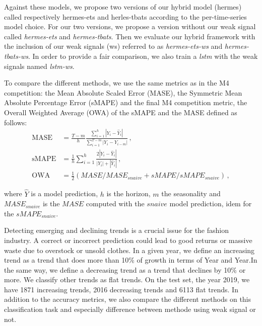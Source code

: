 \documentclass{article} %
\newcommand{\lag}{h}
\begin{document}
Against these models, we propose two versions of our hybrid model (hermes) called respectively hermes-ets and herles-tbats according to the per-time-series model choice.
For our two versions, we propose a version without our weak signal called \textit{hermes-ets} and \textit{hermes-tbats}. Then we evaluate our hybrid framework with the inclusion of our weak signals (ws) referred to as \textit{hermes-ets-ws} and \textit{hermes-tbats-ws}. In order to provide a fair comparison, we also train a \textit{lstm} with the weak signals named \textit{lstm-ws}.

To compare the different methods, we use the same metrics as in the M4 competition: the Mean Absolute Scaled Error (MASE), the Symmetric Mean Absolute Percentage Error (sMAPE) and the final M4 competition metric, the Overall Weighted Average (OWA) of the sMAPE and the MASE defined as follows:
\begin{align*}
\mathrm{MASE} &= \frac{T-m}{h}\frac{\sum_{i=1}^h |Y_i - \hat{Y}_i| }{\sum_{i=1}^{T-m} |Y_i - Y_{i-m}|}\,,\\
\mathrm{sMAPE} &= \frac{1}{h} \sum_{i=1}^h \frac{2|Y_i - \hat{Y}_i|}{|Y_i| + |\hat{Y}_i|}\,,\\
\mathrm{OWA} &= \frac{1}{2}\left(MASE/MASE_{snaive} + sMAPE/sMAPE_{snaive}\right)\,,
\end{align*}

where $\hat{Y}$ is a model prediction, $\lag$ is the horizon, $m$ the seasonality and $MASE_{snaive}$ is the $MASE$ computed with the $snaive$ model prediction, idem for the $sMAPE_{snaive}$.

Detecting emerging and declining trends is a crucial issue for the fashion industry. A correct or incorrect prediction could lead to good returns or massive waste due to overstock or unsold clothes. In a given year, we define an increasing trend as a trend that does more than 10\% of growth in terms of Year and Year.In the same way, we define a decreasing trend as a trend that declines by 10\% or more. We classify other trends as flat trends. On the test set, the year 2019, we have 1871 increasing trends, 2016 decreasing trends and 6113 flat trends. In addition to the accuracy metrics, we also compare the different methods on this classification task and especially difference between methode using weak signal or not.
\end{document}
